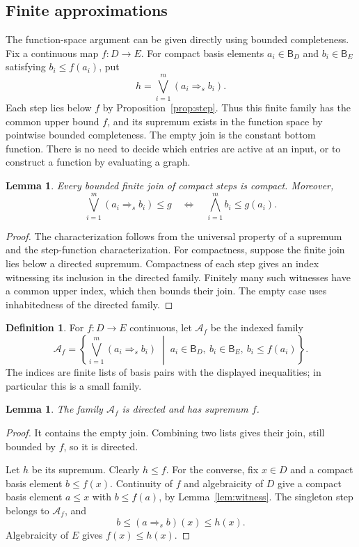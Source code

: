 \documentclass[11pt,a4paper]{article}
\newtheorem{lemma}[theorem]{Lemma}
\theoremstyle{definition}
\newtheorem{definition}[theorem]{Definition}
\theoremstyle{remark}
\newcommand{\B}{\mathsf B}
\newcommand{\step}[2]{(#1\mathbin{\Rightarrow}_{\!s}#2)}
\begin{document}
\subsection{Finite approximations}

The function-space argument can be given directly using bounded
completeness. Fix a continuous map $f:D\to E$. For compact basis elements
$a_i\in\B_D$ and $b_i\in\B_E$ satisfying $b_i\leq f(a_i)$, put
\[
 h=\bigvee_{i=1}^{m}\step{a_i}{b_i}.
\]
Each step lies below $f$ by Proposition~\ref{prop:step}. Thus this finite
family has the common upper bound $f$, and its supremum exists in the
function space by pointwise bounded completeness. The empty join is the
constant bottom function. There is no need to decide which entries are
active at an input, or to construct a function by evaluating a graph.

\begin{lemma}\label{lem:boundedsteps}
Every bounded finite join of compact steps is compact. Moreover,
\[
 \bigvee_{i=1}^{m}\step{a_i}{b_i}\leq g
 \quad\Longleftrightarrow\quad
 \bigwedge_{i=1}^{m} b_i\leq g(a_i).
\]
\end{lemma}
\begin{proof}
The characterization follows from the universal property of a supremum
and the step-function characterization. For compactness, suppose the
finite join lies below a directed supremum. Compactness of each step
gives an index witnessing its inclusion in the directed family. Finitely
many such witnesses have a common upper index, which then bounds their
join. The empty case uses inhabitedness of the directed family.
\end{proof}

\begin{definition}
For $f:D\to E$ continuous, let $\mathcal A_f$ be the indexed family
\[
 \mathcal A_f=
 \left\{
   \bigvee_{i=1}^{m}\step{a_i}{b_i}
   \;\middle|\;
   a_i\in\B_D,\ b_i\in\B_E,\ b_i\leq f(a_i)
 \right\}.
\]
The indices are finite lists of basis pairs with the displayed
inequalities; in particular this is a small family.
\end{definition}

\begin{lemma}\label{lem:stepdensity}
The family $\mathcal A_f$ is directed and has supremum $f$.
\end{lemma}
\begin{proof}
It contains the empty join. Combining two lists gives their join,
still bounded by $f$, so it is directed.

Let $h$ be its supremum. Clearly $h\leq f$. For the converse, fix $x\in D$
and a compact basis element $b\leq f(x)$. Continuity of $f$ and
algebraicity of $D$ give a compact basis element $a\leq x$ with
$b\leq f(a)$, by Lemma~\ref{lem:witness}. The singleton step belongs to
$\mathcal A_f$, and
\[
 b\leq\step a b(x)\leq h(x).
\]
Algebraicity of $E$ gives $f(x)\leq h(x)$.
\end{proof}
\end{document}
